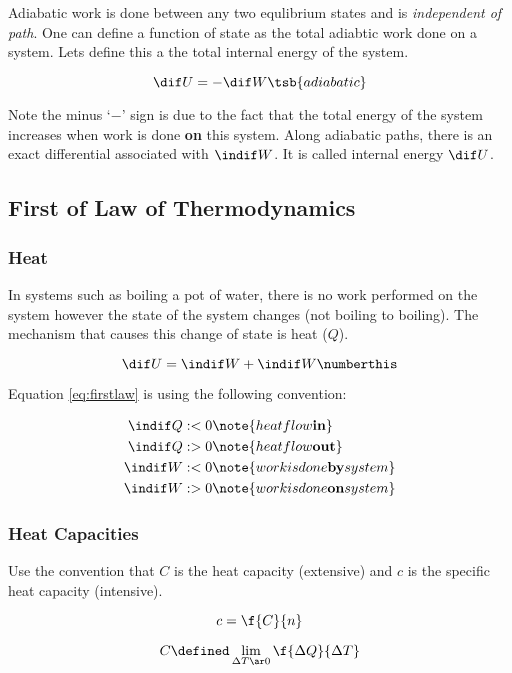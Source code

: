 \documentclass{article}
\begin{document}
Adiabatic work is done between any two equlibrium states and is \textit{independent of path}. One can define a function of state as the total adiabtic work done on a system. Lets define this a the total internal energy of the system.

\[ \dif U = - \dif W\tsb{adiabatic}\]

Note the minus `$-$' sign is due to the fact that the total energy of the system increases when work is done \textbf{on} this system. Along adiabatic paths, there is an exact differential associated with $\indif W$. It is called internal energy $\dif U$.

\subsection{First of Law of Thermodynamics}

\subsubsection{Heat}

In systems such as boiling a pot of water, there is no work performed on the system however the state of the system changes (not boiling to boiling). The mechanism that causes this change of state is heat ($Q$).

\[ \dif U = \indif W + \indif W \numberthis \label{eq:firstlaw} \]

Equation \eqref{eq:firstlaw} is using the following convention:

\begin{align*}
    \indif Q &:< 0 \note{heat flow \textbf{in}} \\
    \indif Q &:> 0 \note{heat flow \textbf{out}} \\
    \indif W &:< 0 \note{work is done \textbf{by} system} \\
    \indif W &:> 0 \note{work is done \textbf{on} system} \\
\end{align*}

\subsubsection{Heat Capacities}

Use the convention that $C$ is the heat capacity (extensive) and $c$ is the specific heat capacity (intensive).

\[ c = \f{C}{n} \]

\[ C \defined \lim_{\Delta T \ar 0} \f{\Delta Q}{\Delta T} \]
\end{document}
